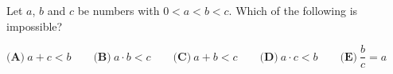 Let $a$, $b$ and $c$ be numbers with $0<a<b<c$. Which of the following is impossible?

$\textbf{(A)}\ a+c<b \qquad \textbf{(B)}\ a\cdot b<c \qquad \textbf{(C)}\ a+b<c \qquad \textbf{(D)}\ a\cdot c<b \qquad \textbf{(E)}\ \dfrac{b}{c}=a$
